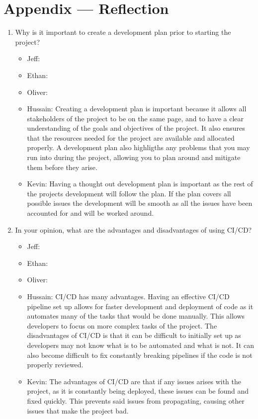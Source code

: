 \documentclass{article}
\begin{document}
\newpage{}

\section*{Appendix --- Reflection}




\begin{enumerate}
    \item Why is it important to create a development plan prior to starting the
    project?
	\begin{itemize}
		\item Jeff:
		\item Ethan:
		\item Oliver:
		\item Hussain: Creating a development plan is important because it allows all stakeholders of the project to be on the same page, and to have a clear understanding of the goals and objectives of the project. It also ensures that the resources needed for the project are available and allocated properly. A development plan also highligths any problems that you may run into during the project, allowing you to plan around and mitigate them before they arise.
		\item Kevin: Having a thought out development plan is important as the rest of the projects development will follow the plan. If the plan covers all possible issues the development will be smooth as all the issues have been accounted for and will be worked around. 
	\end{itemize}
    \item In your opinion, what are the advantages and disadvantages of using
    CI/CD?
	\begin{itemize}
		\item Jeff:
		\item Ethan:
		\item Oliver:
		\item Hussain: CI/CD has many advantages. Having an effective CI/CD pipeline set up allows for faster development and deployment of code as it automates many of the tasks that would be done manually. This allows developers to focus on more complex tasks of the project. The disadvantages of CI/CD is that it can be difficult to initially set up as developers may not know what is to be automated and what is not. It can also become difficult to fix constantly breaking pipelines if the code is not properly reviewed.
		\item Kevin: The advantages of CI/CD are that if any issues arises with the project, as it is constantly being deployed, these issues can be found and fixed quickly. This prevents said issues from propagating, causing other issues that make the project bad.
		

\end{itemize}
\end{enumerate}
\end{document}
